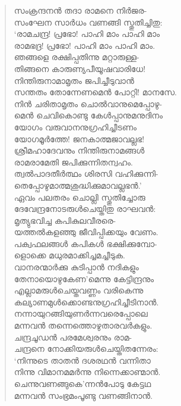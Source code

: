 \begin{verse}
സംക്രന്ദനന്‍ തദാ രാമനെ നിര്‍ജര-\\
സംഘേന സാര്‍ധം വണങ്ങി സ്തുതിച്ചിതു:\\
‘രാമചന്ദ്ര! പ്രഭോ! പാഹി മാം പാഹി മാം\\
രാമഭദ്ര! പ്രഭോ! പാഹി മാം പാഹി മാം.\\
ഞങ്ങളെ രക്ഷിപ്പതിന്നു മറ്റാരുള്ള-\\
തിങ്ങനെ കാരുണ്യപീയൂഷവാരിധേ!\\
നിന്തിരുനാമാമൃതം ജപിച്ചീടുവാന്‍\\
സന്തതം തോന്നേണമെന്‍ പോറ്റി! മാനസേ.\\
നിന്‍ ചരിതാമൃതം ചൊല്‍വാനുമെപ്പോഴു-\\
മെന്‍ ചെവികൊണ്ടു കേള്‍പ്പാനുമനുദിനം\\
യോഗം വരുവാനനുഗ്രഹിച്ചീടണം\\
യോഗമൂര്‍ത്തേ! ജനകാത്മജാവല്ലഭ!\\
ശ്രീമഹാദേവനും നിന്തിരുനാമങ്ങള്‍\\
രാമരാമേതി ജപിക്കുന്നിതന്വഹം.\\
ത്വല്‍പാദതീര്‍ത്ഥം ശിരസി വഹിക്കുന്നി-\\
തെപ്പോഴുമാത്മശുദ്ധിക്കുമാവല്ലഭന്‍.’\\
ഏവം പലതരം ചൊല്ലി സ്തുതിച്ചോരു\\
ദേവേന്ദ്രനോടരുള്‍ചെയ്തിതു രാഘവന്‍:\\
മൃത്യുഭവിച്ച കപികുലവീരരെ-\\
യത്തല്‍കളഞ്ഞു ജീവിപ്പിക്കയും വേണം.\\
പക്വഫലങ്ങള്‍ കപികള്‍ ഭക്ഷിക്കുമ്പോ-\\
ളൊക്കെ മധുരമാക്കിച്ചമച്ചീടുക.\\
വാനരന്മാര്‍ക്കു കുടിപ്പാന്‍ നദികളും\\
തേനായൊഴുകേണ’മെന്നു കേട്ടിന്ദ്രനും\\
എല്ലാമരുള്‍ചെയ്തവണ്ണം വരികെന്നു\\
കല്യാണമുള്‍ക്കൊണ്ടനുഗ്രഹിച്ചീടിനാന്‍.\\
നന്നായുറങ്ങിയുണര്‍ന്നവരെപ്പോലെ\\
മന്നവന്‍ തന്നെത്തൊഴുതാരവര്‍കളും.\\
ചന്ദ്രചൂഡന്‍ പരമേശ്വരനും രാമ-\\
ചന്ദ്രനെ നോക്കിയരുള്‍ചെയ്തിതന്നേരം:\\
‘നിന്നുടെ താതന്‍ ദശരഥന്‍ വന്നിതാ\\
നിന്നു വിമാനമമര്‍ന്നു നിന്നെക്കാണ്മാന്‍.\\
ചെന്നുവണങ്ങുകെ’ന്നന്‍പോടു കേട്ടഥ\\
മന്നവന്‍ സംഭ്രമംപൂണ്ടു വണങ്ങിനാന്‍.\\

\end{verse}
